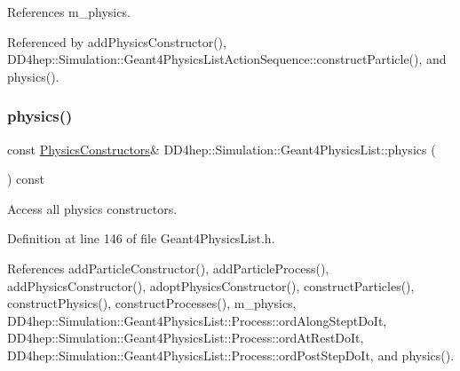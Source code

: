 References m\+\_\+physics.



Referenced by add\+Physics\+Constructor(), D\+D4hep\+::\+Simulation\+::\+Geant4\+Physics\+List\+Action\+Sequence\+::construct\+Particle(), and physics().

\hypertarget{class_d_d4hep_1_1_simulation_1_1_geant4_physics_list_a9c7a312e78c18be81425089986eb540f}{}\label{class_d_d4hep_1_1_simulation_1_1_geant4_physics_list_a9c7a312e78c18be81425089986eb540f} 
\subsubsection{\texorpdfstring{physics()}{physics()}\hspace{0.1cm}{\footnotesize\ttfamily [2/2]}}
{\footnotesize\ttfamily const \hyperlink{class_d_d4hep_1_1_simulation_1_1_geant4_physics_list_a5953826b626c21fa4b26ab9a07f3b8ad}{Physics\+Constructors}\& D\+D4hep\+::\+Simulation\+::\+Geant4\+Physics\+List\+::physics (\begin{DoxyParamCaption}{ }\end{DoxyParamCaption}) const\hspace{0.3cm}{\ttfamily [inline]}}



Access all physics constructors. 



Definition at line 146 of file Geant4\+Physics\+List.\+h.



References add\+Particle\+Constructor(), add\+Particle\+Process(), add\+Physics\+Constructor(), adopt\+Physics\+Constructor(), construct\+Particles(), construct\+Physics(), construct\+Processes(), m\+\_\+physics, D\+D4hep\+::\+Simulation\+::\+Geant4\+Physics\+List\+::\+Process\+::ord\+Along\+Stept\+Do\+It, D\+D4hep\+::\+Simulation\+::\+Geant4\+Physics\+List\+::\+Process\+::ord\+At\+Rest\+Do\+It, D\+D4hep\+::\+Simulation\+::\+Geant4\+Physics\+List\+::\+Process\+::ord\+Post\+Step\+Do\+It, and physics().

\hypertarget{class_d_d4hep_1_1_simulation_1_1_geant4_physics_list_abd2fd72a935c5a809d216026b503e154}{}\label{class_d_d4hep_1_1_simulation_1_1_geant4_physics_list_abd2fd72a935c5a809d216026b503e154} 
